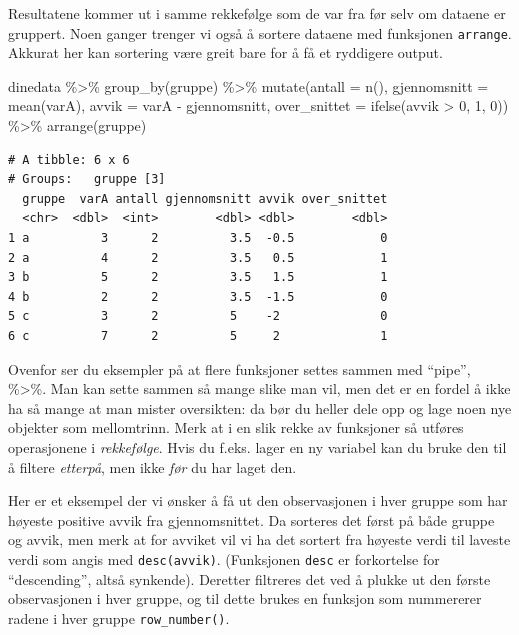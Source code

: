 \documentclass[
  letterpaper,
  DIV=11,
  numbers=noendperiod]{scrreprt}
\newenvironment{Shaded}{\begin{snugshade}}{\end{snugshade}}
\newcommand{\AttributeTok}[1]{\textcolor[rgb]{0.40,0.45,0.13}{#1}}
\newcommand{\DecValTok}[1]{\textcolor[rgb]{0.68,0.00,0.00}{#1}}
\newcommand{\FunctionTok}[1]{\textcolor[rgb]{0.28,0.35,0.67}{#1}}
\newcommand{\NormalTok}[1]{\textcolor[rgb]{0.00,0.23,0.31}{#1}}
\newcommand{\SpecialCharTok}[1]{\textcolor[rgb]{0.37,0.37,0.37}{#1}}
\theoremstyle{definition}
\theoremstyle{remark}
\begin{document}
Resultatene kommer ut i samme rekkefølge som de var fra før selv om
dataene er gruppert. Noen ganger trenger vi også å sortere dataene med
funksjonen \texttt{arrange}. Akkurat her kan sortering være greit bare
for å få et ryddigere output.

\begin{Shaded}
\begin{Highlighting}[]
\NormalTok{dinedata }\SpecialCharTok{\%\textgreater{}\%} 
  \FunctionTok{group\_by}\NormalTok{(gruppe) }\SpecialCharTok{\%\textgreater{}\%} 
  \FunctionTok{mutate}\NormalTok{(}\AttributeTok{antall =} \FunctionTok{n}\NormalTok{(), }\AttributeTok{gjennomsnitt =} \FunctionTok{mean}\NormalTok{(varA), }
         \AttributeTok{avvik =}\NormalTok{ varA }\SpecialCharTok{{-}}\NormalTok{ gjennomsnitt, }
         \AttributeTok{over\_snittet =} \FunctionTok{ifelse}\NormalTok{(avvik }\SpecialCharTok{\textgreater{}} \DecValTok{0}\NormalTok{, }\DecValTok{1}\NormalTok{, }\DecValTok{0}\NormalTok{)) }\SpecialCharTok{\%\textgreater{}\%} 
  \FunctionTok{arrange}\NormalTok{(gruppe)}
\end{Highlighting}
\end{Shaded}

\begin{verbatim}
# A tibble: 6 x 6
# Groups:   gruppe [3]
  gruppe  varA antall gjennomsnitt avvik over_snittet
  <chr>  <dbl>  <int>        <dbl> <dbl>        <dbl>
1 a          3      2          3.5  -0.5            0
2 a          4      2          3.5   0.5            1
3 b          5      2          3.5   1.5            1
4 b          2      2          3.5  -1.5            0
5 c          3      2          5    -2              0
6 c          7      2          5     2              1
\end{verbatim}

Ovenfor ser du eksempler på at flere funksjoner settes sammen med
``pipe'', \%\textgreater\%. Man kan sette sammen så mange slike man vil,
men det er en fordel å ikke ha så mange at man mister oversikten: da bør
du heller dele opp og lage noen nye objekter som mellomtrinn. Merk at i
en slik rekke av funksjoner så utføres operasjonene i \emph{rekkefølge}.
Hvis du f.eks. lager en ny variabel kan du bruke den til å filtere
\emph{etterpå}, men ikke \emph{før} du har laget den.

Her er et eksempel der vi ønsker å få ut den observasjonen i hver gruppe
som har høyeste positive avvik fra gjennomsnittet. Da sorteres det først
på både gruppe og avvik, men merk at for avviket vil vi ha det sortert
fra høyeste verdi til laveste verdi som angis med \texttt{desc(avvik)}.
(Funksjonen \texttt{desc} er forkortelse for ``descending'', altså
synkende). Deretter filtreres det ved å plukke ut den første
observasjonen i hver gruppe, og til dette brukes en funksjon som
nummererer radene i hver gruppe \texttt{row\_number()}.
\end{document}
